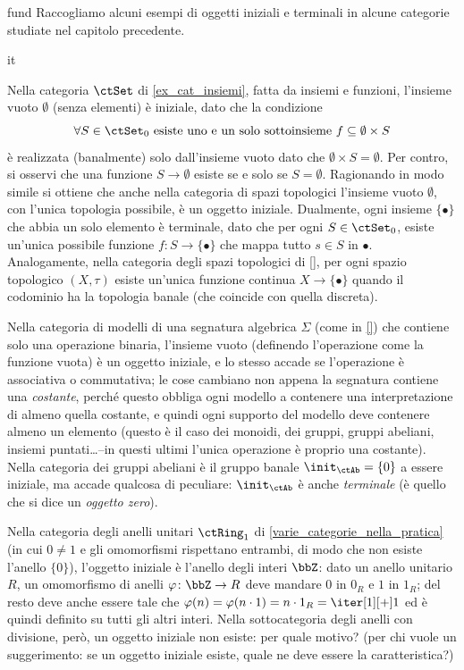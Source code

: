 \begin{hExamples}{fund}
	Raccogliamo alcuni esempi di oggetti iniziali e terminali in alcune categorie studiate nel capitolo precedente.
	\begin{enumtag}{it}
		\item\label{it_1} Nella categoria \(\ctSet\) di \ref{ex_cat_insiemi}, fatta da insiemi e funzioni, l'insieme vuoto \(\emptyset\) (senza elementi) è iniziale, dato che la condizione
		\[\forall S\in\ctSet_0 \text{ esiste uno e un solo sottoinsieme } f\subseteq \emptyset\times S \]
		è realizzata (banalmente) solo dall'insieme vuoto dato che \(\emptyset\times S = \emptyset\). Per contro, si osservi che una funzione \(S \to \emptyset\) esiste se e solo se \(S=\emptyset\). Ragionando in modo simile si ottiene che anche nella categoria di spazi topologici l'insieme vuoto \(\emptyset\), con l'unica topologia possibile, è un oggetto iniziale. Dualmente, ogni insieme \(\{\bullet\}\) che abbia un solo elemento è terminale, dato che per ogni \(S\in\ctSet_0\), esiste un'unica possibile funzione \(f \colon S \to \{\bullet\}\) che mappa tutto \(s\in S\) in \(\bullet\). Analogamente, nella categoria degli spazi topologici di \ref{}, per ogni spazio topologico \((X,\tau)\) esiste un'unica funzione continua \(X \to \{\bullet\}\) quando il codominio ha la topologia banale (che coincide con quella discreta).
		\item\label{it_2} Nella categoria di modelli di una segnatura algebrica \(\Sigma\) (come in \ref{}) che contiene solo una operazione binaria, l'insieme vuoto (definendo l'operazione come la funzione vuota) è un oggetto iniziale, e lo stesso accade se l'operazione è associativa o commutativa; le cose cambiano non appena la segnatura contiene una \emph{costante}, perché questo obbliga ogni modello a contenere una interpretazione di almeno quella costante, e quindi ogni supporto del modello deve contenere almeno un elemento (questo è il caso dei monoidi, dei gruppi, gruppi abeliani, insiemi puntati\dots --in questi ultimi l'unica operazione è proprio una costante). Nella categoria dei gruppi abeliani è il gruppo banale \(\init_\ctAb=\{0\}\) a essere iniziale, ma accade qualcosa di peculiare: \(\init_\ctAb\) è anche \emph{terminale} (è quello che si dice un \emph{oggetto zero}).
		\item\label{it_3} Nella categoria degli anelli unitari \(\ctRing_1\) di \ref{varie_categorie_nella_pratica} (in cui \(0\ne 1\) e gli omomorfismi rispettano entrambi, di modo che non esiste l'anello \(\{0\}\)), l'oggetto iniziale è l'anello degli interi \(\bbZ\): dato un anello unitario \(R\), un omomorfismo di anelli \(\varphi \colon \bbZ \to R\) deve mandare \(0\) in \(0_R\) e \(1\) in \(1_R\); del resto deve anche essere tale che \(\varphi(n) = \varphi(n\cdot 1) = n \cdot 1_R = \iter[1][+]1\) ed è quindi definito su tutti gli altri interi. Nella sottocategoria degli anelli con divisione, però, un oggetto iniziale non esiste: per quale motivo? (per chi vuole un suggerimento: se un oggetto iniziale esiste, quale ne deve essere la caratteristica?)

\end{enumtag}
\end{hExamples}
